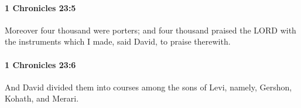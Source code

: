 		\paragraph{1 Chronicles 23:5} %
			\label{1CHRONICLES-23-5}

			Moreover four thousand were porters; and four thousand praised the LORD with the instruments which I made, said David, to praise therewith.


		\paragraph{1 Chronicles 23:6} %
			\label{1CHRONICLES-23-6}

			And David divided them into courses among the sons of Levi, namely, Gershon, Kohath, and Merari.


